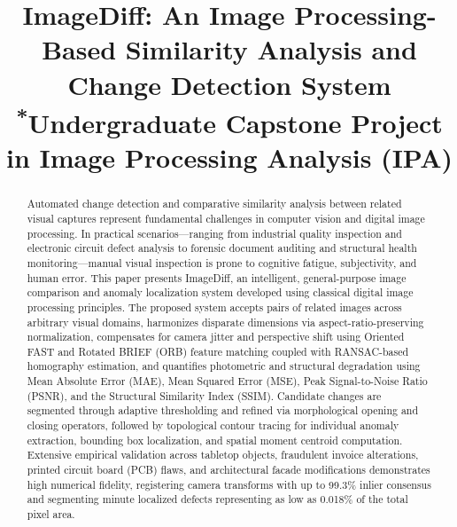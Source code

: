 \documentclass[conference]{IEEEtran}
\begin{document}
\title{ImageDiff: An Image Processing-Based Similarity Analysis and Change Detection System\\
{\footnotesize \textsuperscript{*}Undergraduate Capstone Project in Image Processing Analysis (IPA)}
}

\author{
\and
{}
}

\maketitle

\begin{abstract}
Automated change detection and comparative similarity analysis between related visual captures represent fundamental challenges in computer vision and digital image processing. In practical scenarios—ranging from industrial quality inspection and electronic circuit defect analysis to forensic document auditing and structural health monitoring—manual visual inspection is prone to cognitive fatigue, subjectivity, and human error. This paper presents ImageDiff, an intelligent, general-purpose image comparison and anomaly localization system developed using classical digital image processing principles. The proposed system accepts pairs of related images across arbitrary visual domains, harmonizes disparate dimensions via aspect-ratio-preserving normalization, compensates for camera jitter and perspective shift using Oriented FAST and Rotated BRIEF (ORB) feature matching coupled with RANSAC-based homography estimation, and quantifies photometric and structural degradation using Mean Absolute Error (MAE), Mean Squared Error (MSE), Peak Signal-to-Noise Ratio (PSNR), and the Structural Similarity Index (SSIM). Candidate changes are segmented through adaptive thresholding and refined via morphological opening and closing operators, followed by topological contour tracing for individual anomaly extraction, bounding box localization, and spatial moment centroid computation. Extensive empirical validation across tabletop objects, fraudulent invoice alterations, printed circuit board (PCB) flaws, and architectural facade modifications demonstrates high numerical fidelity, registering camera transforms with up to 99.3\% inlier consensus and segmenting minute localized defects representing as low as 0.018\% of the total pixel area.
\end{abstract}
\end{document}

